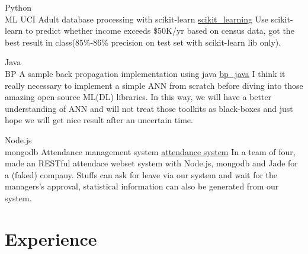\documentclass[letterpaper]{twentysecondcv} %
\begin{document}
\begin{twenty}

    \twentyitem
        {Python \\ ML}
        {UCI Adult database processing with scikit-learn}
        {\href{https://github.com/MiaoDX/scikit\_learning/}{scikit\_learning}}
        {}
        {Use scikit-learn to predict whether income exceeds \$50K/yr based on census data, got the best result in class(85\%-86\% precision on test set with scikit-learn lib only).}


        
    \twentyitem
        {Java \\ BP}
        {A sample back propagation implementation using java}
        {\href{https://github.com/MiaoDX/bp_java}{bp\_java}}
        {}                
        {I think it really necessary to implement a simple ANN from scratch before diving into those amazing open source ML(\/DL) libraries. In this way, we will have a better understanding of ANN and will not treat those toolkits as black-boxes and just hope we will get nice result after an uncertain time.}

    \twentyitem
        {Node.js \\ mongodb}
        {Attendance management system}
        {\href{https://github.com/SEAPC2016/attendance}{attendance system}}
        {}
        {In a team of four, made an RESTful attendace webset system with Node.js, mongodb and Jade for a (faked) company. Stuffs can ask for leave via our system and wait for the managers's approval, statistical information can also be generated from our system.}

        


\end{twenty}


\section{Experience}
\end{document}
